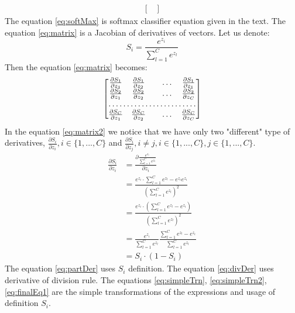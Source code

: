 \documentclass[10pt,a4paper]{article}
\begin{document}
\begin{enumerate}
\begin{align}
\begin{bmatrix}
\end{bmatrix} \label{eq:matrix}
\end{align}
The equation \ref{eq:softMax} is softmax classifier equation given in the text. 
The equation \ref{eq:matrix} is a Jacobian of derivatives of vectors. 
Let us denote: $$S_i = \frac{ e^{z_{i}}}{\sum_{l=1}^{C}e^{z_{l}}}$$
Then the equation \ref{eq:matrix} becomes:
\begin{align}
\begin{bmatrix}
    \frac{\partial S_1}{\partial z_1}     & 
    \frac{\partial S_1}{\partial z_2}      &  & \dots & \frac{\partial S_1}{\partial z_1}  \\
    \frac{\partial S_2}{\partial z_1}     & 
    \frac{\partial S_2}{\partial z_2}      &  & \dots & \frac{\partial S_2}{\partial z_C}\\
    \hdotsfor{5} \\
    \frac{\partial S_C}{\partial z_1}     & 
    \frac{\partial S_C}{\partial z_2}      &  & \dots & \frac{\partial S_C}{\partial z_C}\\
\end{bmatrix}\label{eq:matrix2}
\end{align}
In the equation \ref{eq:matrix2} we notice that we have only two "different" type of derivatives, $\frac{\partial S_i}{\partial z_i}, i \in \{ 1, ..., C\}$ and $\frac{\partial S_i}{\partial z_j}, i \ne j, i \in \{ 1, ..., C\}, j \in \{ 1, ..., C\}$.
\begin{align}
\frac{\partial S_i}{\partial z_i} &= 
\frac{\partial \frac{ e^{z_{i}}}{\sum_{l=1}^{C}e^{z_{l}}}}{\partial z_i} \label{eq:partDer}\\
&= \frac{e^{z_{i}} \cdot \sum_{l=1}^{C}e^{z_{l}} - e^{z_{i}} e^{z_{i}}}
{\left(\sum_{l=1}^{C}e^{z_{l}}\right)^2}
\label{eq:divDer}\\
&= \frac{e^{z_{i}} \cdot \left(\sum_{l=1}^{C}e^{z_{l}} -  e^{z_{i}}\right)}
{\left(\sum_{l=1}^{C}e^{z_{l}}\right)^2}
\label{eq:simpleTrn}\\
&= \frac{e^{z_{i}}}{\sum_{l=1}^{C}e^{z_{l}}}\frac{ \sum_{l=1}^{C}e^{z_{l}} -  e^{z_{i}}}
{\sum_{l=1}^{C}e^{z_{l}}}
\label{eq:simpleTrn2}\\
&= S_i \cdot (1 - S_i) \label{eq:finalEq1}
\end{align}
The equation \ref{eq:partDer} uses $S_i$ definition. The equation \ref{eq:divDer} uses derivative of division rule. The equations \ref{eq:simpleTrn}, \ref{eq:simpleTrn2}, \ref{eq:finalEq1} are the simple transformations of the expressions and usage of definition $S_i$.
\begin{align}

\end{align}
\end{enumerate}
\end{document}
